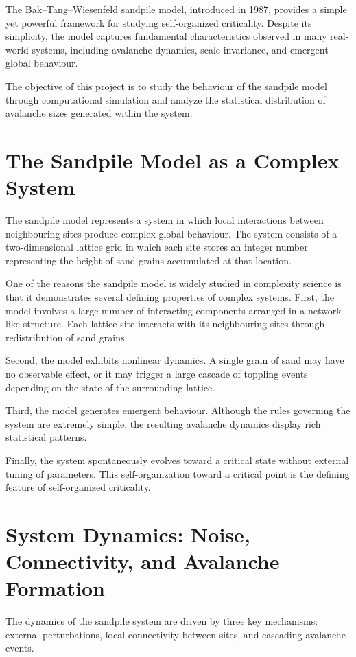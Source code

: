 \documentclass[12pt]{article}
\begin{document}
The Bak--Tang--Wiesenfeld sandpile model, introduced in 1987, provides a simple yet powerful framework for studying self-organized criticality. Despite its simplicity, the model captures fundamental characteristics observed in many real-world systems, including avalanche dynamics, scale invariance, and emergent global behaviour.

The objective of this project is to study the behaviour of the sandpile model through computational simulation and analyze the statistical distribution of avalanche sizes generated within the system.

\section{The Sandpile Model as a Complex System}

The sandpile model represents a system in which local interactions between neighbouring sites produce complex global behaviour. The system consists of a two-dimensional lattice grid in which each site stores an integer number representing the height of sand grains accumulated at that location.

One of the reasons the sandpile model is widely studied in complexity science is that it demonstrates several defining properties of complex systems. First, the model involves a large number of interacting components arranged in a network-like structure. Each lattice site interacts with its neighbouring sites through redistribution of sand grains.

Second, the model exhibits nonlinear dynamics. A single grain of sand may have no observable effect, or it may trigger a large cascade of toppling events depending on the state of the surrounding lattice.

Third, the model generates emergent behaviour. Although the rules governing the system are extremely simple, the resulting avalanche dynamics display rich statistical patterns.

Finally, the system spontaneously evolves toward a critical state without external tuning of parameters. This self-organization toward a critical point is the defining feature of self-organized criticality.

\section{System Dynamics: Noise, Connectivity, and Avalanche Formation}

The dynamics of the sandpile system are driven by three key mechanisms: external perturbations, local connectivity between sites, and cascading avalanche events.
\end{document}
